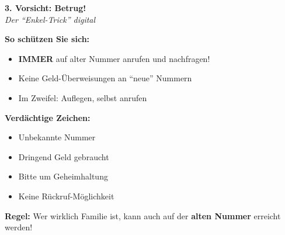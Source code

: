 \documentclass[a4paper,landscape,8pt]{extarticle}
\begin{document}
\begin{minipage}[t]{0.32\linewidth}
\begin{center}
\colorbox{warnred!10}{%
\begin{minipage}{0.95\linewidth}
\vspace{2mm}
\begin{center}
{\Large\bfseries\textcolor{warnred}{3. Vorsicht: Betrug!}}\\[1pt]
{\footnotesize\itshape Der ``Enkel-Trick'' digital}
\end{center}
\vspace{2mm}
\end{minipage}%
}
\end{center}

\vspace{1mm}


\vspace{2mm}

\textbf{So schützen Sie sich:}
\begin{itemize}
\item \textbf{IMMER} auf alter Nummer anrufen und nachfragen!
\item Keine Geld-Überweisungen an ``neue'' Nummern
\item Im Zweifel: Auflegen, selbst anrufen
\end{itemize}

\textbf{Verdächtige Zeichen:}
\begin{itemize}
\item Unbekannte Nummer
\item Dringend Geld gebraucht
\item Bitte um Geheimhaltung
\item Keine Rückruf-Möglichkeit
\end{itemize}

\textbf{Regel:} Wer wirklich Familie ist, kann auch auf der \textbf{alten Nummer} erreicht werden!

\end{minipage}

\vspace{1mm}

\begin{center}
\end{center}
\end{document}
